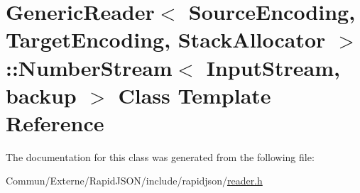 \hypertarget{class_generic_reader_1_1_number_stream}{}\section{Generic\+Reader$<$ Source\+Encoding, Target\+Encoding, Stack\+Allocator $>$\+:\+:Number\+Stream$<$ Input\+Stream, backup $>$ Class Template Reference}
\label{class_generic_reader_1_1_number_stream}


The documentation for this class was generated from the following file\+:\begin{DoxyCompactItemize}
\item 
Commun/\+Externe/\+Rapid\+J\+S\+O\+N/include/rapidjson/\hyperlink{reader_8h}{reader.\+h}\end{DoxyCompactItemize}
